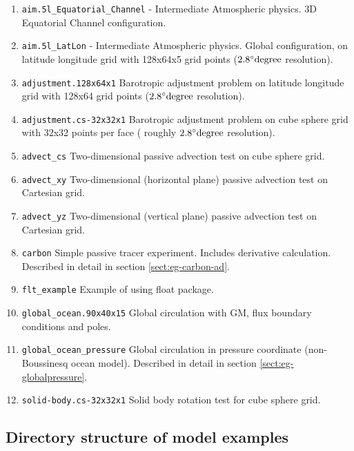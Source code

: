 \begin{enumerate}
\item \texttt{aim.5l\_Equatorial\_Channel} - Intermediate Atmospheric
  physics. 3D Equatorial Channel configuration.
  
\item \texttt{aim.5l\_LatLon} - Intermediate Atmospheric physics.
  Global configuration, on latitude longitude grid with 128x64x5 grid
  points ($2.8^\circ{\rm degree}$ resolution).
  
\item \texttt{adjustment.128x64x1} Barotropic adjustment problem on
  latitude longitude grid with 128x64 grid points ($2.8^\circ{\rm
    degree}$ resolution).
  
\item \texttt{adjustment.cs-32x32x1} Barotropic adjustment problem on
  cube sphere grid with 32x32 points per face ( roughly $2.8^\circ{\rm
    degree}$ resolution).
  
\item \texttt{advect\_cs} Two-dimensional passive advection test on
  cube sphere grid.
  
\item \texttt{advect\_xy} Two-dimensional (horizontal plane) passive
  advection test on Cartesian grid.
  
\item \texttt{advect\_yz} Two-dimensional (vertical plane) passive
  advection test on Cartesian grid.
  
\item \texttt{carbon} Simple passive tracer experiment. Includes
  derivative calculation. Described in detail in section
  \ref{sect:eg-carbon-ad}.

\item \texttt{flt\_example} Example of using float package.
  
\item \texttt{global\_ocean.90x40x15} Global circulation with GM, flux
  boundary conditions and poles.

\item \texttt{global\_ocean\_pressure} Global circulation in pressure
  coordinate (non-Boussinesq ocean model). Described in detail in
  section \ref{sect:eg-globalpressure}.
  
\item \texttt{solid-body.cs-32x32x1} Solid body rotation test for cube
  sphere grid.

\end{enumerate}

\subsection{Directory structure of model examples}

